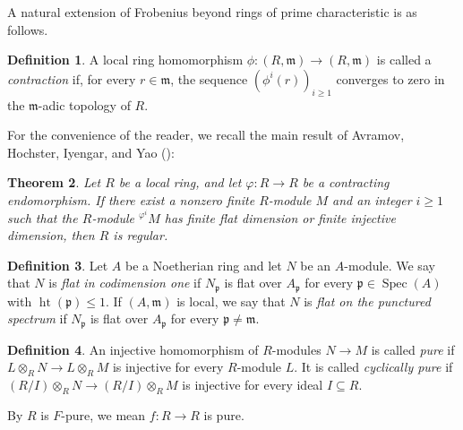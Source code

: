 \documentclass[12pt,reqno]{amsart}
\newtheorem{theorem}{Theorem}[section]
\theoremstyle{definition}
\newtheorem{definition}[theorem]{Definition}
\theoremstyle{remark}
\theoremstyle{cited}
\theoremstyle{remark}
\theoremstyle{citeddef}
\DeclareMathOperator{\Spec}{Spec}
\DeclareMathOperator{\height}{ht}
\newcommand{\fp}{\mathfrak{p}}
\begin{document}
	A natural extension of Frobenius beyond rings of prime characteristic is as follows.
	
	\begin{definition}\label{contd}
		A local ring homomorphism \( \phi: (R, \mathfrak{m}) \to (R, \mathfrak{m}) \) is called a \emph{contraction} if, for every \( r \in \mathfrak{m} \), the sequence \( (\phi^i(r))_{i \geq 1} \) converges to zero in the \( \mathfrak{m} \)-adic topology of \( R \).
	\end{definition}
	
	For the convenience of the reader, we recall the main result of Avramov, Hochster, Iyengar, and Yao (\cite[Theorem~1.1]{AHIY}):
	
	\begin{theorem}\label{AHIY} \cite[Theorem 1.1]{AHIY}
		Let \(R\) be a local ring, and let \(\varphi\colon R \to R \) be a contracting endomorphism. If there exist a nonzero finite \(R\)-module \(M\) and an integer \(i\geq 1\) such that the \(R\)-module \({}^{\varphi^i}\!M\) has finite flat dimension or finite injective dimension, then \(R\) is regular.
	\end{theorem}
	
	
	\begin{definition}\label{def:flat-codimension}
		Let $A$ be a Noetherian ring and let $N$ be an $A$-module. We say that $N$ is
		\emph{flat in codimension one} if $N_{\fp}$ is flat over $A_{\fp}$ for every
		$\fp\in\Spec(A)$ with $\height(\fp)\leq 1$.
		If $(A,\mathfrak m)$ is local, we say that $N$ is
		\emph{flat on the punctured spectrum} if $N_{\fp}$ is flat over $A_{\fp}$ for
		every $\fp\neq\mathfrak m$.
	\end{definition}
	
	
	\begin{definition}\label{def:pure-map}
		An injective homomorphism of $R$-modules
		\(
		N\to M
		\)
		is called \emph{pure} if
		\(
		L\otimes_RN\to L\otimes_RM
		\)
		is injective for every $R$-module $L$. It is called
		\emph{cyclically pure} if
		\(
		(R/I)\otimes_RN\to(R/I)\otimes_RM
		\)
		is injective for every ideal $I\subseteq R$.
	\end{definition}
	By $R$ is $F$-pure, we mean $f: R \to R$ is pure.
	
\end{document}
